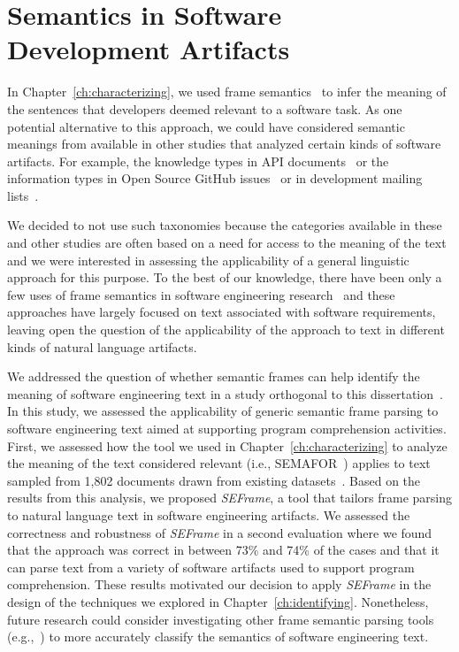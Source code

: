 

\section{Semantics in Software Development Artifacts}
\label{cp7:semantics}



In Chapter~\ref{ch:characterizing}, we used frame semantics~\cite{fillmore1976frame}
to infer the meaning of the sentences
that developers deemed relevant to  a software task.
As one potential alternative to this approach, 
we could have considered 
semantic meanings from 
available in other studies 
that analyzed certain kinds of software artifacts. 
For example, the knowledge types in API documents~\cite{Maalej2013}
or the information types in Open Source GitHub issues~\cite{Arya2019} or 
in development mailing lists~\cite{Sorbo2015}.



We decided to not use such taxonomies because the categories available in these and other studies 
are often based
on a need for access to the meaning of
the text
and we were interested in assessing the
applicability of a general linguistic approach for this purpose.
To the best of our knowledge, there have been only a few uses of frame
semantics in software engineering research~\cite{jha2017, kundi2017, alhoshan2019using}
and these approaches
have largely focused on text associated
with software requirements, leaving open the
question of the applicability of the approach to
text in different kinds of natural language artifacts.



We addressed the question of whether semantic
frames can help identify the meaning of
software engineering text
in a study 
orthogonal to this dissertation~\cite{marques2021}. 
In this study, we assessed the applicability of generic semantic frame
parsing to software engineering text
aimed at supporting program
comprehension activities.
First, we assessed how the tool we used in Chapter~\ref{ch:characterizing}
to analyze the meaning of the text considered relevant (i.e., SEMAFOR~\cite{das2014frame})
 applies to text sampled from 1,802 documents drawn from existing datasets~\cite{Arya2019, Xu2017, Maalej2013, Chaparro2017}. 
Based on the results from this analysis, 
we proposed \textit{SEFrame}, a tool that tailors 
frame parsing to natural language text in software engineering artifacts.
We assessed the correctness and robustness of \textit{SEFrame} in a second evaluation where we found that the approach was 
 correct in between 73\% and 74\% of
the cases and that it can parse text from a variety of software artifacts used to support program
comprehension. These results motivated our decision to apply \textit{SEFrame} 
in the design of the techniques we explored in Chapter~\ref{ch:identifying}.
Nonetheless,  
future research could consider
investigating other 
frame semantic parsing tools (e.g.,~\cite{swayamdipta17, chen2021joint}) to more
accurately classify the semantics of software engineering text.
 




